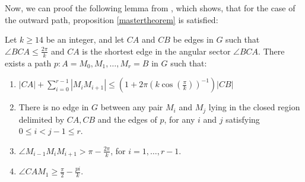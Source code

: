 Now, we can proof the following lemma from \cite{kanj}, which shows, that for the case of the outward path, proposition \ref{mastertheorem} is satisfied:

\begin{lemma}
Let $k \geq 14$ be an integer, and let $CA $ and $CB $ be edges in $G $ such that $\angle{BCA} \leq \frac{2\pi}{k} $ and $CA $ is the shortest edge in the angular sector $\angle{BCA} $. There exists a path $p : A=M_0, M_1, \dotsc, M_r=B $ in $G $ such that:
\begin{enumerate}
\renewcommand{\labelenumi}{(\roman{enumi})}
\item $|CA| + \sum_{i=0}^{r-1}|M_iM_{i+1}| \leq (1+2\pi(k \cos(\frac{\pi}{k}))^{-1})|CB|$
\item There is no edge in $G $ between any pair $M_i $ and $M_j $ lying in the closed region delimited by $CA, CB $ and the edges of $p $, for any $i $ and $j $ satisfying $0 \leq i < j -1 \leq r $.
\item $\angle{M_{i-1}M_iM_{i+1}} > \pi - \frac{2\pi}{k} $, for $i=1,\dotsc,r-1 $.
\item $\angle{CAM_1} \geq \frac{\pi}{2} - \frac{pi}{k} $.
\end{enumerate}	 
\end{lemma}

